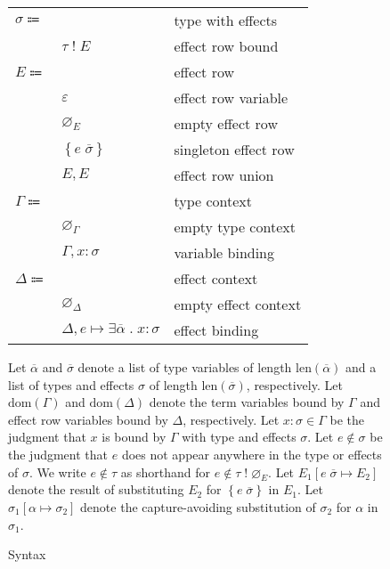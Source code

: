 \documentclass[12pt]{article}
\newcommand\parens[1]{\left( #1 \right)} %
\newcommand\lstof[1]{\overline{#1}}
\newcommand\lstlen[1]{\text{len}\parens{\lstof{#1}}}
\newcommand\evar{x}
\newcommand\ttype{\tau}
\newcommand\tvar{\alpha}
\newcommand\tx{\sigma}
\newcommand\twithx[2]{#1 \; ! \; #2} %
\newcommand\tanno[2]{#1 : #2} %
\newcommand\tsub[3]{#1 \left[ #2 \mapsto #3 \right]} %
\newcommand\xeffects{E}
\newcommand\xvar{\varepsilon}
\newcommand\xempty{\varnothing_{\xeffects}}
\newcommand\xtapp[2]{#1 \; \lstof{#2}}
\newcommand\xsingleton[1]{\left\{ #1 \right\}}
\newcommand\xunion[2]{#1, #2}
\newcommand\xeffect{e}
\newcommand\xnotint[2]{#1 \notin #2} %
\newcommand\xsub[3]{#1 \left[ #2 \mapsto #3 \right]} %
\newcommand\ccontext{\Gamma}
\newcommand\cempty{\varnothing_{\ccontext}}
\newcommand\cextend[2]{#1, #2}
\newcommand\cdom[1]{\text{dom}\parens{#1}}
\newcommand\dcontext{\Delta}
\newcommand\dempty{\varnothing_{\dcontext}}
\newcommand\dextend[2]{#1, #2}
\newcommand\deffect[4]{#1 \mapsto \exists #2 \; . \; \tanno{#3}{#4}} %
\newcommand\ddom[1]{\text{dom}\parens{#1}}
\begin{document}
\begin{figure}
\begin{mdframed}[backgroundcolor=none]
\begin{center}
\begin{tabular}{l l l}
          $\tx \Coloneqq$ & & type with effects \\
          & $\twithx{\ttype}{\xeffects}$ & effect row bound \\
          $\xeffects \Coloneqq$ & & effect row \\
          & $\xvar$ & effect row variable \\
          & $\xempty$ & empty effect row \\
          & $\xsingleton{\xtapp{\xeffect}{\tx}}$ & singleton effect row \\
          & $\xunion{\xeffects}{\xeffects}$ & effect row union \\
          $\ccontext \Coloneqq$ & & type context \\
          & $\cempty$ & empty type context \\
          & $\cextend{\ccontext}{\tanno{\evar}{\tx}}$ & variable binding \\
          $\dcontext \Coloneqq$ & & effect context \\
          & $\dempty$ & empty effect context \\
          & $\dextend{\dcontext}{\deffect{\xeffect}{\lstof{\tvar}}{\evar}{\tx}}$ & effect binding \\
        \end{tabular}
      \end{center}

      \bigskip

      Let $\lstof{\tvar}$ and $\lstof{\tx}$ denote a list of type variables of length $\lstlen{\tvar}$ and a list of types and effects $\tx$ of length $\lstlen{\tx}$, respectively. Let $\cdom{\ccontext}$ and $\ddom{\dcontext}$ denote the term variables bound by $\ccontext$ and effect row variables bound by $\dcontext$, respectively. Let $\tanno{\evar}{\tx} \in \ccontext$ be the judgment that $\evar$ is bound by $\ccontext$ with type and effects $\tx$. Let $\xnotint{\xeffect}{\tx}$ be the judgment that $\xeffect$ does not appear anywhere in the type or effects of $\tx$. We write $\xnotint{\xeffect}{\ttype}$ as shorthand for $\xnotint{\xeffect}{\twithx{\ttype}{\xempty}}$. Let $\xsub{\xeffects_1}{\xtapp{\xeffect}{\tx}}{\xeffects_2}$ denote the result of substituting $\xeffects_2$ for $\xsingleton{\xtapp{\xeffect}{\tx}}$ in $\xeffects_1$. Let $\tsub{\tx_1}{\tvar}{\tx_2}$ denote the capture-avoiding substitution of $\tx_2$ for $\tvar$ in $\tx_1$.

      \caption{Syntax}\label{fig:syntax}
    \end{mdframed}
  \end{figure}
\end{document}
